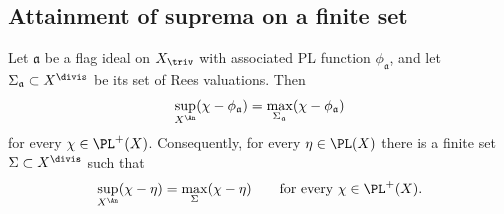 \subsection{Attainment of suprema on a finite set}
\label{sec:ch35-attainment}

\begin{lemma}
\label{lem:ch35-finite-attainment}
Let $\mathfrak a$ be a flag ideal on $X_{\triv}$ with associated PL
function $\phi_{\mathfrak a}$, and let
$\Sigma_{\mathfrak a}\subset X^{\divis}$ be its set of Rees valuations.
Then
\begin{equation}
\label{eq:ch35-finite-attainment}
 \sup_{X^{\An}}(\chi-\phi_{\mathfrak a})
 =\max_{\Sigma_{\mathfrak a}}(\chi-\phi_{\mathfrak a})
\end{equation}
for every $\chi\in\PL^+(X)$.  Consequently, for every
$\eta\in\PL(X)$ there is a finite set $\Sigma\subset X^{\divis}$ such
that
\begin{equation}
\label{eq:ch35-finite-attainment-general}
 \sup_{X^{\An}}(\chi-\eta)=\max_\Sigma(\chi-\eta)
 \qquad\text{for every }\chi\in\PL^+(X).
\end{equation}
\end{lemma}

